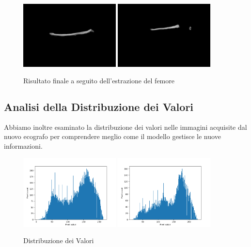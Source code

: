 \begin{figure}[!ht]
    \centering
    \includegraphics[width=0.45\textwidth]{./Immagini/nuovo_ecografo_results/0_extracted_femur.png}
    \includegraphics[width=0.45\textwidth]{./Immagini/nuovo_ecografo_results/3_extracted_femur.png}
    \caption{Risultato finale a seguito dell'estrazione del femore}
    \label{fig:segmentazione_modello}
\end{figure}

\subsection{Analisi della Distribuzione dei Valori}
\label{subsec:analisi_distribuzione_valori}
Abbiamo inoltre esaminato la distribuzione dei valori nelle immagini acquisite dal nuovo ecografo
per comprendere meglio come il modello gestisce le nuove informazioni.

\begin{figure}[!ht]
    \centering
    \includegraphics[width=0.45\textwidth]{./Immagini/nuovo_ecografo_results/hist_0_distribution_value.csv.png}
    \includegraphics[width=0.45\textwidth]{./Immagini/nuovo_ecografo_results/hist_3_distribution_value.csv.png}
    \caption{Distribuzione dei Valori}
    \label{fig:distribuzione_valori}
\end{figure}

